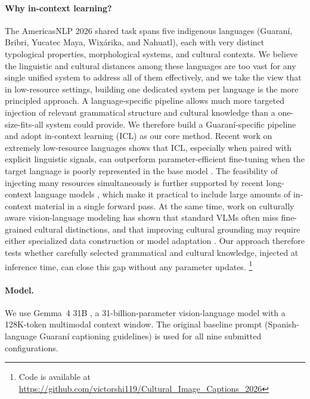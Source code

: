 \documentclass[11pt]{article}
\begin{document}
\paragraph{Why in-context learning?}
The AmericasNLP 2026 shared task spans five indigenous languages (Guaran\'{i},
Bribri, Yucatec Maya, Wix\'{a}rika, and Nahuatl), each with very distinct
typological properties, morphological systems, and cultural contexts. We
believe the linguistic and cultural distances among these languages are too
vast for any single unified system to address all of them effectively, and we
take the view that in low-resource settings, building one dedicated system per
language is the more principled approach. A language-specific pipeline allows
much more targeted injection of relevant grammatical structure and cultural
knowledge than a one-size-fits-all system could provide.
We therefore build a Guaran\'{i}-specific pipeline and adopt in-context
learning (ICL) as our core method. Recent work on extremely low-resource
languages shows that ICL, especially when paired with explicit linguistic signals, can outperform parameter-efficient fine-tuning when the target language is poorly represented in the base model
\citep{li-etal-2025-context-learning}. The feasibility of injecting many resources simultaneously is further supported by recent long-context language models \citep{team2024gemini}, which make it practical to include large amounts of in-context material in a single forward pass. At the same time, work on culturally aware vision-language modeling has shown that standard VLMs often miss
fine-grained cultural distinctions, and that improving cultural grounding may
require either specialized data construction or model adaptation
\citep{huang2025cultureclip}. Our approach therefore tests whether carefully
selected grammatical and cultural knowledge, injected at inference time, can close this gap without any parameter updates. \footnote{Code is available at \url{https://github.com/victorshi119/Cultural_Image_Captions_2026}}

\paragraph{Model.}
We use Gemma~4 31B \cite{gemmateam2025gemma4}, a 31-billion-parameter vision-language model with a 128K-token multimodal context window.
The original baseline prompt (Spanish-language Guaran\'{i} captioning guidelines)
is used for all nine submitted configurations.
\end{document}
